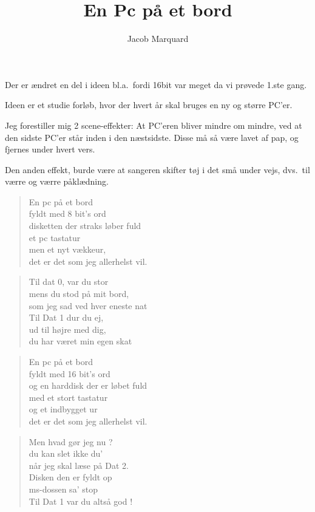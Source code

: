 \documentclass[a4paper,11pt]{article}
\title{En Pc på et bord}
\author{Jacob Marquard}
\begin{document}
\maketitle

\begin{sketch}

Der er ændret en del i ideen bl.a.\ fordi 16bit var meget da vi
prøvede 1.ste gang.

Ideen er et studie forløb, hvor der hvert år skal bruges en ny
og større PC'er.

Jeg forestiller mig 2 scene-effekter:
At PC'eren bliver mindre om mindre, ved at den sidste PC'er
står inden i den næstsidste. Disse må så være lavet af pap,
og fjernes under hvert vers.

Den anden effekt, burde være at sangeren skifter tøj i det små
under vejs, dvs.\ til værre og værre påklædning.

\begin{verse}
En pc på et bord\\
fyldt med 8 bit's ord\\
disketten der straks løber fuld\\
et pc tastatur \\
men et nyt vækkeur,\\
det er det som jeg allerhelst vil.\\
\end{verse}

\begin{verse}
	Til dat 0, var du stor\\
	mens du stod på mit bord,\\
	som jeg sad ved hver eneste nat\\
	Til Dat 1 dur du ej,\\
	ud til højre med dig,\\
	du har været min egen skat\\
\end{verse}

\begin{verse}
En pc på et bord\\
fyldt med 16 bit's ord\\
og en harddisk der er løbet fuld\\
med et stort tastatur \\
og et indbygget ur\\
det er det som jeg allerhelst vil.\\
\end{verse}

\begin{verse}
	Men hvad gør jeg nu ?\\
	du kan slet ikke du'\\
	når jeg skal læse på Dat 2.\\
	Disken den er fyldt op\\
	{\sc ms}-dossen sa' stop\\
	Til Dat 1 var du altså god !\\
\end{verse}


\end{sketch}
\end{document}
